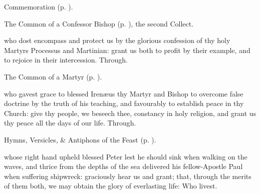 \begin{rubric}
	 Commemoration  (p. \pageref{ProcessusCollect}).
\end{rubric}



\begin{rubric}
	The Common of a Confessor Bishop (p. \pageref{ConfessorBishopCollect}), the second Collect.
\end{rubric}



\memorialCollect\label{ProcessusCollect}
 who dost encompass and protect us by the glorious confession of thy holy Martyrs Processus and Martinian: grant us both to profit by their example, and to rejoice in their intercession. Through.



\begin{rubric}
	The Common of a Martyr (p. \pageref{CommonMartyr}).
\end{rubric}

{} who gavest grace to blessed Iren{\ae}us thy Martyr and Bishop to overcome false doctrine by the truth of his teaching, and favourably to establish peace in thy Church: give thy people, we beseech thee, constancy in holy religion, and grant us thy peace all the days of our life. Through.



\begin{rubric}
	Hymns, Versicles, \& Antiphons of the Feast (p. \pageref{SaintPeter}).
\end{rubric}

{} whose right hand upheld blessed Peter lest he should sink when walking on the waves, and thrice from the depths of the sea delivered his fellow-Apostle Paul when suffering shipwreck: graciously hear us and grant; that, through the merits of them both, we may obtain the glory of everlasting life: Who livest.


